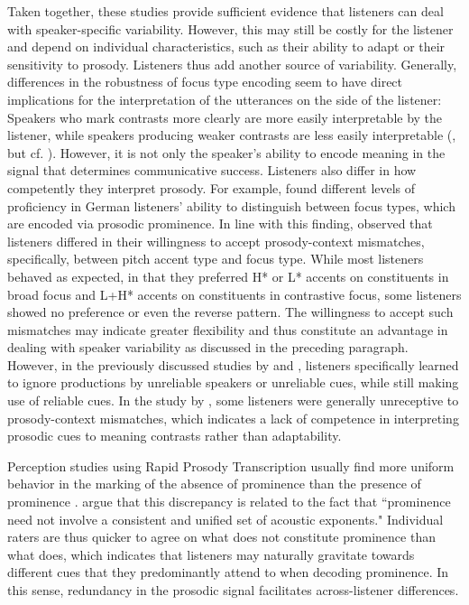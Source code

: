 Taken together, these studies provide sufficient evidence that listeners can deal with speaker-specific variability. However, this may still be costly for the listener and depend on individual characteristics, such as their ability to adapt or their sensitivity to prosody. Listeners thus add another source of variability. Generally, differences in the robustness of focus type encoding seem to have direct implications for the interpretation of the utterances on the side of the listener: Speakers who mark contrasts more clearly are more easily interpretable by the listener, while speakers producing weaker contrasts are less easily interpretable (\citealt{cangemiListenerSpecificPerceptionSpeakerSpecific2015}, but cf. \citealt{ipSearchSalienceFocus2021}). However, it is not only the speaker's ability to encode meaning in the signal that determines communicative success. Listeners also differ in how competently they interpret prosody.
For example, \citet{cangemiListenerSpecificPerceptionSpeakerSpecific2015} found different levels of proficiency in German listeners' ability to distinguish between focus types, which are encoded via prosodic prominence. In line with this finding, \citet{jabeenVariabilityPerceptionProsody2021} observed that listeners differed in their willingness to accept prosody-context mismatches, specifically, between pitch accent type and focus type. While most listeners behaved as expected, in that they preferred H* or L* accents on constituents in broad focus and L+H* accents on constituents in contrastive focus, some listeners showed no preference or even the reverse pattern. The willingness to accept such mismatches may indicate greater flexibility and thus constitute an advantage in dealing with speaker variability as discussed in the preceding paragraph. However, in the previously discussed studies by \citet{roettgerListenersAdaptationUnreliable2020} and \citet{jasminShorttermPerceptualReweighting2022}, listeners specifically learned to ignore productions by unreliable speakers or unreliable cues, while still making use of reliable cues. In the study by \citet{jabeenVariabilityPerceptionProsody2021}, some listeners were generally unreceptive to prosody-context mismatches, which indicates a lack of competence in interpreting prosodic cues to meaning contrasts rather than adaptability.

Perception studies using Rapid Prosody Transcription \citep[RPT,][]{coleNewMethodsProsodic2016} usually find more uniform behavior in the marking of the absence of prominence than the presence of prominence \citep[e.g.,][]{coleNewMethodsProsodic2016}. \citet[181]{laddProsodicProminenceLanguages2023} argue that this discrepancy is related to the fact that ``prominence need not involve a consistent and unified set of acoustic exponents." Individual raters are thus quicker to agree on what does not constitute prominence than what does, which indicates that listeners may naturally gravitate towards different cues that they predominantly attend to when decoding prominence. In this sense, redundancy in the prosodic signal facilitates across-listener differences. 

